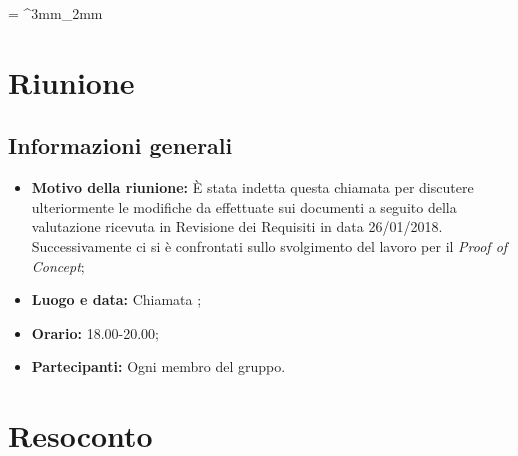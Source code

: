 \documentclass[VER-2018-05-02.tex]{subfiles}
\begin{document}
\tabulinesep = ^3mm_2mm
\chapter{Riunione}
\section{Informazioni generali}
\begin{itemize}
	\item \textbf{Motivo della riunione:} \`{E} stata indetta questa chiamata  per discutere ulteriormente le modifiche da effettuate sui documenti a seguito della valutazione ricevuta in Revisione dei Requisiti in data 26/01/2018. \\ Successivamente ci si è confrontati sullo svolgimento del lavoro per il \textit{Proof of Concept};
	\item \textbf{Luogo e data:} Chiamata ;
	\item \textbf{Orario:} 18.00-20.00;
	\item \textbf{Partecipanti:} Ogni membro del gruppo.
\end{itemize}


\chapter{Resoconto}
\end{document}
